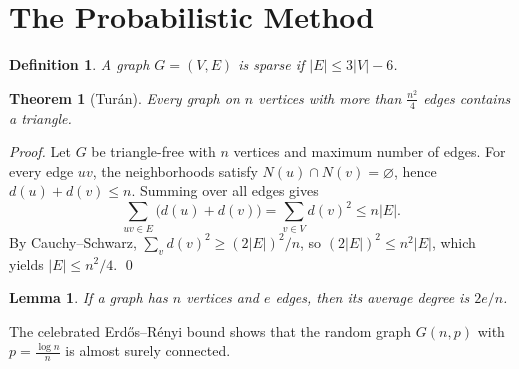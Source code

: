 \documentclass[11pt]{book}
\newtheorem{theorem}{Theorem}[section]
\newtheorem{lemma}{Lemma}[section]
\newtheorem{definition}{Definition}[section]
\begin{document}
\section{The Probabilistic Method}

\begin{definition}
A graph \(G=(V,E)\) is \emph{sparse} if \(|E| \le 3|V|-6\).
\end{definition}

\begin{theorem}[Tur\'an]
Every graph on \(n\) vertices with more than \(\frac{n^2}{4}\) edges contains a triangle.
\end{theorem}

\begin{proof}
Let \(G\) be triangle-free with \(n\) vertices and maximum number of edges.
For every edge \(uv\), the neighborhoods satisfy \(N(u)\cap N(v)=\varnothing\),
hence \(d(u)+d(v)\le n\). Summing over all edges gives
\[
\sum_{uv\in E}\bigl(d(u)+d(v)\bigr)=\sum_{v\in V} d(v)^2 \le n|E|.
\]
By Cauchy--Schwarz, \(\sum_v d(v)^2 \ge (2|E|)^2/n\), so \((2|E|)^2 \le n^2|E|\),
which yields \(|E|\le n^2/4\). \qed
\end{proof}

\begin{lemma}
If a graph has \(n\) vertices and \(e\) edges, then its average degree is \(2e/n\).
\end{lemma}

The celebrated Erd\H{o}s--R\'enyi bound shows that the random graph
\(G(n,p)\) with \(p=\frac{\log n}{n}\) is almost surely connected.
\end{document}
